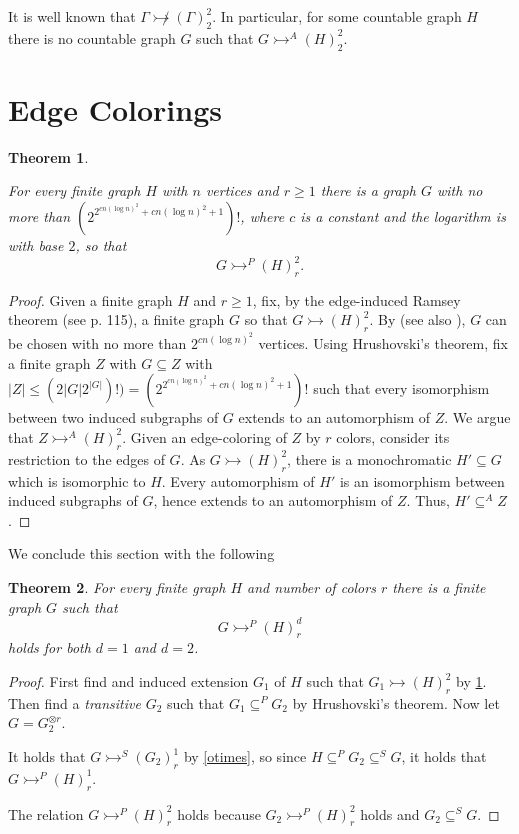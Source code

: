 \documentclass[11pt]{amsart}
\newcommand{\ars}{\rightarrowtail}
\newcommand{\su}{\subseteq}
\newtheorem{theorem}{Theorem}[section]
\begin{document}
It is well known \cite{EHP} that $\Gamma \not\ars (\Gamma)^2_2$.
In particular, for some countable graph $H$ there is no
countable graph $G$ such that $G\ars^A(H)^2_2$.

\section{Edge Colorings}

\begin{theorem}\label{edge}
\item For every finite graph $H$ with $n$ vertices and $r\ge 1$ there
  is a graph $G$ with no more than $(2^{2^{cn(\log n)^2} + cn (\log
      n)^2 +1})!$, where $c$ is a constant and the logarithm is with
    base $2$,  so that
\[G\ars^{P}(H)^2_r.\]
\end{theorem}

\begin{proof}
 Given a finite graph $H$ and $r\ge 1$, fix, by the edge-induced
  Ramsey theorem (see \cite{GRS} p. 115), a finite graph $G$ so that
  $G\ars (H)^2_r$. By \cite{KPR} (see also \cite{FS}), $G$ can be
  chosen with no more than $2^{cn (\log n)^2}$ vertices.  Using
  Hrushovski's theorem, fix a finite graph $Z$ with $G\su Z$ with
  $|Z|\le (2|G|2^{|G|})!)=(2^{2^{cn(\log n)^2} + cn (\log
      n)^2 +1})!$ such that every isomorphism between two induced
  subgraphs of $G$ extends to an automorphism of $Z$. We argue that
  $Z\ars^A(H)^2_r$.  Given an edge-coloring of $Z$ by $r$ colors,
  consider its restriction to the edges of $G$. As $G\ars (H)^2_r$,
  there is a monochromatic $H'\su G$ which is isomorphic to $H$.
  Every automorphism of $H'$ is an isomorphism between induced
  subgraphs of $G$, hence extends to an automorphism of $Z$. Thus,
  $H'\su^A Z$.
\end{proof}


We conclude this section with the following

\begin{theorem}For every finite graph $H$ and number
of colors $r$ there is a finite graph $G$ such that
\[G\rightarrowtail^P(H)^d_r\]
holds for both   $d=1$ and $d=2$.
\end{theorem}

\begin{proof}
First find and induced extension $G_1$ of $H$ such that
$G_1\rightarrowtail (H)^2_r$ by \ref{edge}. Then find a
\emph{transitive} $G_2$ such that $G_1\su^P G_2$
by Hrushovski's
theorem. Now let $G=G_2^{\otimes r}$.

It holds that $G\rightarrowtail ^S(G_2)^1_r$ by \ref{otimes}, so
since $H\su ^P G_2\su^S  G$, it holds that
$G\rightarrowtail^P(H)^1_r$.

The  relation $G\rightarrowtail^P(H)^2_r$ holds because
$G_2\rightarrowtail^P(H)^2_r$ holds and $G_2\su^SG$.
\end{proof}
\end{document}
